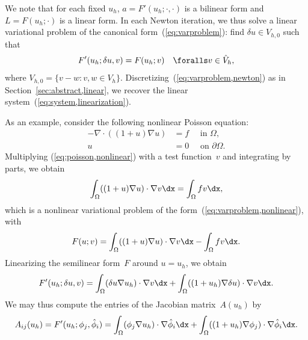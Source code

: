 We note that for each fixed $u_h$, $a = F'(u_h; \cdot, \cdot)$ is a
bilinear form and $L = F(u_h; \cdot)$ is a linear form. In each Newton
iteration, we thus solve a linear variational problem of the canonical
form~(\ref{eq:varproblem}): find $\delta u \in V_{h,0}$ such that
\begin{equation} \label{eq:varproblem,newton}
  \begin{split}
    F'(u_h; \delta u, v) = F(u_h; v) \quad \foralls v \in \hat{V}_h,
  \end{split}
\end{equation}
where $V_{h,0} = \{v - w: v, w \in
V_h\}$. Discretizing~(\ref{eq:varproblem,newton}) as in
Section~\ref{sec:abstract,linear}, we recover the linear
system~(\ref{eq:system,linearization}).

\begin{example}

As an example, consider the following nonlinear Poisson equation:
\begin{equation} \label{eq:poisson,nonlinear}
  \begin{split}
    - \nabla \cdot ((1+u) \nabla u) &= f \quad \mbox{ in } \Omega, \\
    u &= 0 \quad \mbox{ on } \partial\Omega.
  \end{split}
\end{equation}
Multiplying (\ref{eq:poisson,nonlinear}) with a test function~$v$ and
integrating by parts, we obtain
\begin{equation}
  \int_{\Omega} ((1+u) \nabla u) \cdot \nabla v \dx =
  \int_{\Omega} f v \dx,
\end{equation}
which is a nonlinear variational problem of the
form~(\ref{eq:varproblem,nonlinear}), with
\begin{equation}
  F(u; v) = \int_{\Omega} ((1+u) \nabla u) \cdot \nabla v \dx
  - \int_{\Omega} f v \dx.
\end{equation}
Linearizing the semilinear form~$F$ around $u = u_h$, we obtain
\begin{equation}
  F'(u_h; \delta u, v) =
  \int_{\Omega} (\delta u \nabla u_h) \cdot \nabla v \dx +
  \int_{\Omega} ((1 + u_h) \nabla \delta u) \cdot \nabla v \dx.
\end{equation}
We may thus compute the entries of the Jacobian matrix~$A(u_h)$ by
\begin{equation}
  A_{ij}(u_h) = F'(u_h; \phi_j, \hat{\phi}_i) =
  \int_{\Omega} (\phi_j \nabla u_h) \cdot \nabla \hat{\phi}_i \dx +
  \int_{\Omega} ((1 + u_h) \nabla \phi_j) \cdot \nabla \hat{\phi}_i \dx.
\end{equation}

\end{example}


